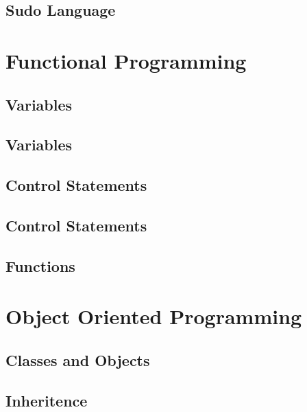 \documentclass[10pt,a4paper,titlepage]{book}
\begin{document}
\section{Sudo Language}

\vfill
\pagebreak
\chapter{Functional Programming}

\vfill
\pagebreak
\section{Variables}

\vfill
\pagebreak
\section{Variables~}

\vfill
\pagebreak
\section{Control Statements}

\vfill
\pagebreak
\section{Control Statements~}

\vfill
\pagebreak
\section{Functions}

\vfill
\pagebreak
\chapter{Object Oriented Programming}

\vfill
\pagebreak
\section{Classes and Objects}

\vfill
\pagebreak
\section{Inheritence}

\vfill
\pagebreak
\end{document}
